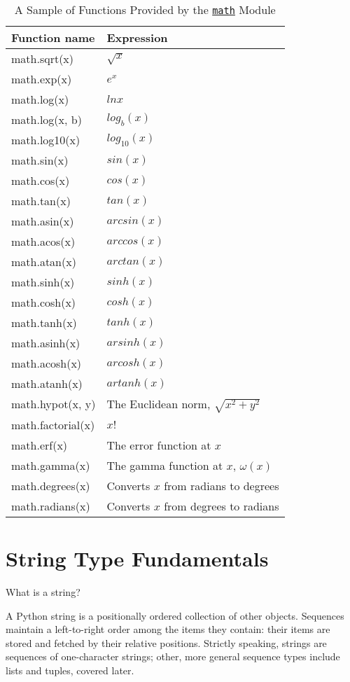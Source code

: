 \documentclass[a4paper,11pt]{book}
\newcommand{\question}[1]{%
    \begin{tcolorbox}[colback=comp_c!10,colframe=comp_c,sidebyside align=top,width=\linewidth,before skip=1ex]
        #1
    \end{tcolorbox}%
    \switchcolumn%
}
\newcommand{\note}[1]{%
    \begin{tcolorbox}[colback=white!0,colframe=white!10,width=\linewidth,before skip=1ex]
        #1
    \end{tcolorbox}         
}
\begin{document}
\begin{table}[!htbp]
	\centering
	\caption{A Sample of Functions Provided by the \href{https://docs.python.org/3/library/math.html}{\texttt{math}} Module}
	\label{tab:math_module_functions}
	\begin{tabular}{ll}
		\toprule \toprule
		Function name &  Expression \\
		\midrule
		math.sqrt(x) & $\sqrt{x}$ \\
		math.exp(x) & $e^{x}$ \\
		math.log(x) & $ln{x}$ \\
		math.log(x, b) & $log_{b}(x)$ \\
		math.log10(x) & $log_{10}(x)$ \\
		math.sin(x) & $sin(x)$ \\
		math.cos(x) & $cos(x)$ \\
		math.tan(x) & $tan(x)$ \\
		math.asin(x) & $arcsin(x)$ \\
		math.acos(x) & $arccos(x)$ \\
		math.atan(x) & $arctan(x)$ \\
		math.sinh(x) & $sinh(x)$ \\
		math.cosh(x) & $cosh(x)$ \\
		math.tanh(x) & $tanh(x)$ \\
		math.asinh(x) & $arsinh(x)$ \\
		math.acosh(x) & $arcosh(x)$ \\
		math.atanh(x) & $artanh(x)$ \\
		math.hypot(x, y) & The Euclidean norm, $\sqrt{x^{2} + y^{2}}$ \\
		math.factorial(x) & $x!$ \\
		math.erf(x) & The error function at $x$ \\
		math.gamma(x) & The gamma function at $x$, $\omega(x)$ \\
		math.degrees(x) & Converts $x$ from radians to degrees \\
		math.radians(x) & Converts $x$ from degrees to radians\\
		\bottomrule 
	\end{tabular}
\end{table}
\clearpage

\section{String Type Fundamentals}

\begin{paracol}{2}
	\question{What is a string?}
	\note{A Python string is a positionally ordered collection of other objects. Sequences maintain a left-to-right order among the items they contain: their items are stored and fetched by their relative positions. Strictly speaking, strings are sequences of one-character strings; other, more general sequence types include lists and tuples, covered later.}
\end{paracol}
\end{document}
